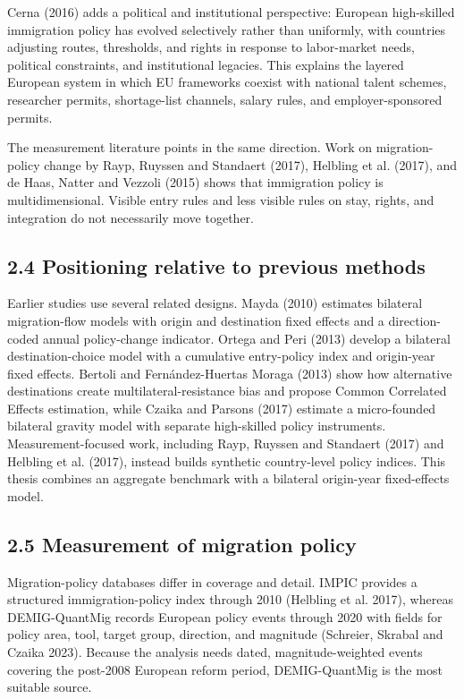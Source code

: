 \documentclass[11pt,a4paper]{article}
\begin{document}
Cerna (2016) adds a political and institutional perspective: European
high-skilled immigration policy has evolved selectively rather than
uniformly, with countries adjusting routes, thresholds, and rights in
response to labor-market needs, political constraints, and institutional
legacies. This explains the layered European system in which EU
frameworks coexist with national talent schemes, researcher permits,
shortage-list channels, salary rules, and employer-sponsored permits.

The measurement literature points in the same direction. Work on
migration-policy change by Rayp, Ruyssen and Standaert (2017), Helbling
et al. (2017), and de Haas, Natter and Vezzoli (2015) shows that
immigration policy is multidimensional. Visible entry rules and less
visible rules on stay, rights, and integration do not necessarily move
together.

\subsection{2.4 Positioning relative to previous
methods}\label{positioning-relative-to-previous-methods}

Earlier studies use several related designs. Mayda (2010) estimates
bilateral migration-flow models with origin and destination fixed
effects and a direction-coded annual policy-change indicator. Ortega and
Peri (2013) develop a bilateral destination-choice model with a
cumulative entry-policy index and origin-year fixed effects. Bertoli and
Fernández-Huertas Moraga (2013) show how alternative destinations create
multilateral-resistance bias and propose Common Correlated Effects
estimation, while Czaika and Parsons (2017) estimate a micro-founded
bilateral gravity model with separate high-skilled policy instruments.
Measurement-focused work, including Rayp, Ruyssen and Standaert (2017)
and Helbling et al. (2017), instead builds synthetic country-level
policy indices. This thesis combines an aggregate benchmark with a
bilateral origin-year fixed-effects model.

\subsection{2.5 Measurement of migration
policy}\label{measurement-of-migration-policy}

Migration-policy databases differ in coverage and detail. IMPIC provides
a structured immigration-policy index through 2010 (Helbling et al.
2017), whereas DEMIG-QuantMig records European policy events through
2020 with fields for policy area, tool, target group, direction, and
magnitude (Schreier, Skrabal and Czaika 2023). Because the analysis
needs dated, magnitude-weighted events covering the post-2008 European
reform period, DEMIG-QuantMig is the most suitable source.
\end{document}
